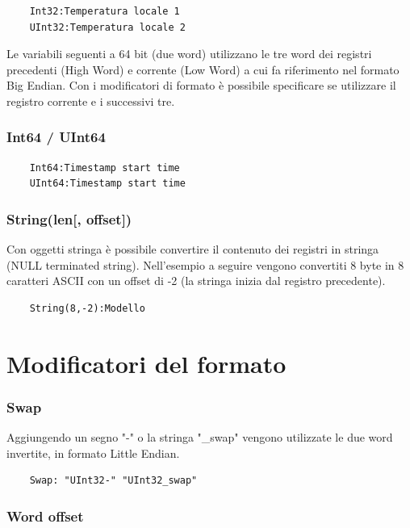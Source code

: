 \begin{verbatim}
    Int32:Temperatura locale 1
    UInt32:Temperatura locale 2
\end{verbatim}

Le variabili seguenti a 64 bit (due word) utilizzano le tre word dei registri precedenti (High Word) e
corrente (Low Word) a cui fa riferimento nel formato Big Endian. Con i modificatori 
di formato è possibile specificare se utilizzare il registro corrente e i successivi tre.

\subsubsection{Int64 / UInt64}

\begin{verbatim}
    Int64:Timestamp start time
    UInt64:Timestamp start time
\end{verbatim}

\subsubsection{String(len[, offset])}

Con oggetti stringa è possibile convertire il contenuto dei registri
in stringa (NULL terminated string). Nell'esempio a seguire
vengono convertiti 8 byte in 8 caratteri ASCII con un offset di -2
(la stringa inizia dal registro precedente).

\begin{verbatim}
    String(8,-2):Modello
\end{verbatim}

\section{Modificatori del formato}

\subsubsection{Swap}

Aggiungendo un segno "-" o la stringa "\_swap" vengono utilizzate 
le due word invertite, in formato Little Endian.

\begin{verbatim}
    Swap: "UInt32-" "UInt32_swap"
\end{verbatim}

\subsubsection{Word offset}

